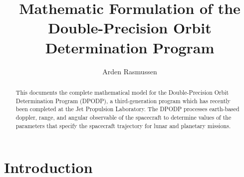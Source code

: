 \documentclass{article}
\title{Mathematic Formulation of the Double-Precision Orbit Determination
Program}
\author{Arden Rasmussen}
\begin{document}

\maketitle

\newpage


\begin{abstract}
  This documents the complete mathematical model for the Double-Precision Orbit
  Determination Program (DPODP), a third-generation program which has recently
  been completed at the Jet Propulsion Laboratory. The DPODP processes
  earth-based doppler, range, and angular observable of the spacecraft to
  determine values of the parameters that specify the spacecraft trajectory for
  lunar and planetary missions.
\end{abstract}

\newpage


\tableofcontents

\newpage


\section{Introduction}
\label{sec:introduction}
\end{document}
